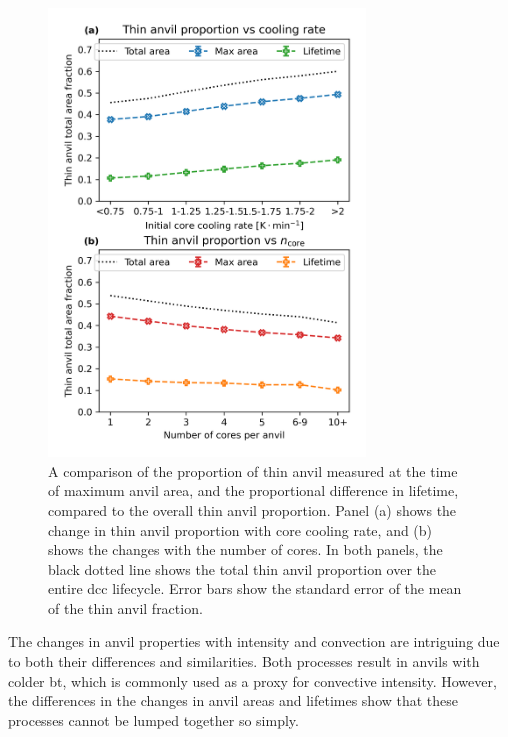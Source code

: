 \begin{figure}[tp]
    \centering
    \includegraphics[width=0.75\textwidth]{figures/chapter3_08.png}
    \caption[
    A comparison of the proportion of thin anvil measured at the time of maximum anvil area, and the proportional difference in lifetime, compared to the overall thin anvil proportion.
    ]{
    A comparison of the proportion of thin anvil measured at the time of maximum anvil area, and the proportional difference in lifetime, compared to the overall thin anvil proportion. Panel (a) shows the change in thin anvil proportion with core cooling rate, and (b) shows the changes with the number of cores. In both panels, the black dotted line shows the total thin anvil proportion over the entire \acrshort{dcc} lifecycle. Error bars show the standard error of the mean of the thin anvil fraction.
    }
    \label{fig:max_area_and_lifetime_contributions}
\end{figure}

The changes in anvil properties with intensity and convection are intriguing due to both their differences and similarities.
Both processes result in anvils with colder \acrshort{bt}, which is commonly used as a proxy for convective intensity.
However, the differences in the changes in anvil areas and lifetimes show that these processes cannot be lumped together so simply.


